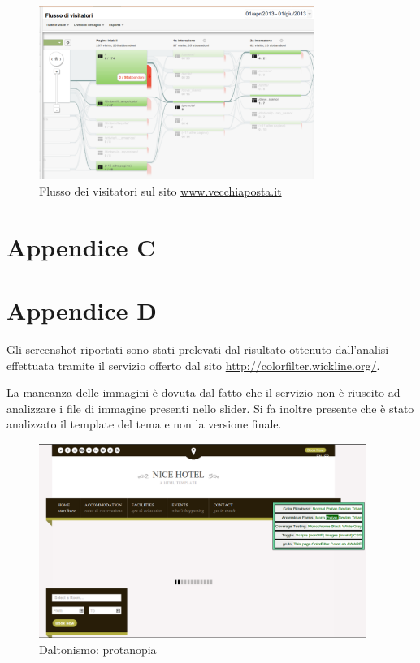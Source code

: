 \documentclass[a4paper,12pt,hidelinks]{report}
\begin{document}
   \begin{figure}[h!]%
    \includegraphics[width=0.80\textwidth,keepaspectratio=true]{img/googleFlusso}
    \centering
    \caption{Flusso dei visitatori sul sito \url{www.vecchiaposta.it}}%
    \label{fig:googleFlusso}%
  \end{figure}
  
\newpage
\section{Appendice C}

\section{Appendice D}
Gli screenshot riportati sono stati prelevati dal risultato ottenuto dall'analisi effettuata tramite il servizio offerto dal sito \url{http://colorfilter.wickline.org/}. 
\par La mancanza delle immagini è dovuta dal fatto che il servizio non è riuscito ad analizzare i file di immagine presenti nello slider. Si fa inoltre presente che è stato 
analizzato il template del tema e non la versione finale.
\begin{figure}[h!]%
  \includegraphics[width=0.95\textwidth,keepaspectratio=true]{img/daltonismoProtanopia}
  \centering
  \caption{Daltonismo: protanopia}%
  \label{fig:daltonismoProtanopia}%
\end{figure}
\end{document}

